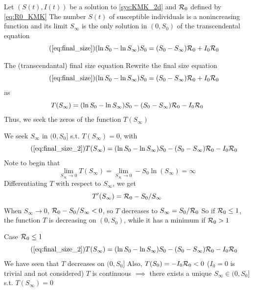 \documentclass[aspectratio=43]{beamer}
\begin{document}
\begin{frame}{}
\begin{theorem}
  Let $(S(t),I(t))$ be a solution to \eqref{sys:KMK_2d} and $\mathcal{R}_0$ defined by \eqref{eq:R0_KMK}
  \vskip0.5cm
  The number $S(t)$ of susceptible individuals is a nonincreasing function and its limit $S_\infty$ is the only solution in $(0,S_0)$ of the transcendental equation
  \begin{equation}\tag{\ref{eq:final_size}}
  (\ln S_0-\ln S_\infty)S_0 = (S_0-S_\infty)\R_0+I_0\R_0
  \end{equation}
\end{theorem}
\end{frame}



\begin{frame}{The (transcendantal) final size equation}
  Rewrite the final size equation
  \begin{equation}
    \tag{\ref{eq:final_size}}
  (\ln S_0-\ln S_\infty)S_0 = (S_0-S_\infty)\R_0+I_0\R_0
  \end{equation}
  as
  \begin{equation}
  \label{eq:final_size_2}
  T(S_\infty) =(\ln S_0-\ln S_\infty)S_0
  - (S_0-S_\infty)\mathcal{R}_0 -I_0\mathcal{R}_0
\end{equation}
\vfill
Thus, we seek the zeros of the function $T(S_\infty)$
\end{frame}



\begin{frame}{}
  We seek $S_\infty$ in $(0,S_0]$ s.t. $T(S_\infty)=0$, with
  \begin{equation}\tag{\ref{eq:final_size_2}}
    T(S_\infty) =(\ln S_0-\ln S_\infty)S_0
    - (S_0-S_\infty)\R_0 -I_0\R_0      
  \end{equation}
  \vfill
  Note to begin that 
  $$
  \lim_{S_\infty\to 0}T(S_\infty)=\lim_{S_\infty\to 0}-S_0\ln(S_\infty)=\infty
  $$
  \vfill
  Differentiating $T$ with respect to $S_\infty$, we get 
  $$
  T'(S_\infty)=\mathcal{R}_0-S_0/S_\infty
  $$ 
  \vfill
  When $S_\infty\to 0$, $\mathcal{R}_0-S_0/S_\infty<0$, so $T$ decreases to $S_\infty=S_0/\mathcal{R}_0$
  \vfill
  So if $\mathcal{R}_0\leq 1$, the function $T$ is decreasing on $(0,S_0)$, while it has a minimum if $\mathcal{R}_0>1$
\end{frame}



\begin{frame}{Case $\mathcal{R}_0\leq 1$}
  \begin{equation}\tag{\ref{eq:final_size_2}}
    T(S_\infty) =(\ln S_0-\ln S_\infty)S_0
    - (S_0-S_\infty)\R_0 -I_0\R_0      
  \end{equation}
  \vfill
  \bbullet We have seen that $T$ decreases on $(0,S_0]$
  \vfill
  \bbullet Also, $T(S_0)=-I_0\mathcal{R}_0<0$ ($I_0=0$ is trivial and not considered)
  \vfill
  \bbullet $T$ is continuous
  \vfill
  $\implies$ there exists a unique $S_\infty\in (0,S_0]$ s.t. $T(S_\infty)=0$
\end{frame}
\end{document}
